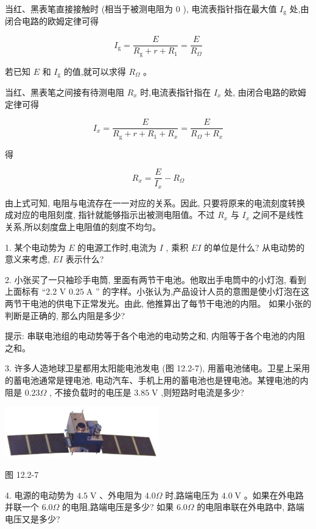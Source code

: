 \documentclass[10pt]{article}
\begin{document}
当红、黑表笔直接接触时 (相当于被测电阻为 0 ), 电流表指针指在最大值 \({I}_{\mathrm{g}}\) 处,由闭合电路的欧姆定律可得

\[
{I}_{\mathrm{g}} = \frac{E}{{R}_{\mathrm{g}} + r + {R}_{1}} = \frac{E}{{R}_{\Omega }}
\]

若已知 \(E\) 和 \({I}_{\mathrm{g}}\) 的值,就可以求得 \({R}_{\Omega }\) 。

当红、黑表笔之间接有待测电阻 \({R}_{x}\) 时,电流表指针指在 \({I}_{x}\) 处, 由闭合电路的欧姆定律可得

\[
{I}_{x} = \frac{E}{{R}_{\mathrm{g}} + r + {R}_{1} + {R}_{x}} = \frac{E}{{R}_{\Omega } + {R}_{x}}
\]

得

\[
{R}_{x} = \frac{E}{{I}_{x}} - {R}_{\Omega }
\]

由上式可知, 电阻与电流存在一一对应的关系。因此, 只要将原来的电流刻度转换成对应的电阻刻度, 指针就能够指示出被测电阻值。不过 \({R}_{x}\) 与 \({I}_{x}\) 之间不是线性关系,所以刻度盘上电阻值的刻度不均匀。

1. 某个电动势为 \(E\) 的电源工作时,电流为 \(I\) , 乘积 \({EI}\) 的单位是什么? 从电动势的意义来考虑, \({EI}\) 表示什么?

2. 小张买了一只袖珍手电筒, 里面有两节干电池。他取出手电筒中的小灯泡, 看到上面标有 “2.2 V \({0.25}\mathrm{\;A}\) ” 的字样。小张认为,产品设计人员的意图是使小灯泡在这两节干电池的供电下正常发光。由此, 他推算出了每节干电池的内阻。 如果小张的判断是正确的, 那么内阻是多少?

提示: 串联电池组的电动势等于各个电池的电动势之和, 内阻等于各个电池的内阻之和。

3. 许多人造地球卫星都用太阳能电池发电 (图 12.2-7), 用蓄电池储电。卫星上采用的蓄电池通常是锂电池, 电动汽车、手机上用的蓄电池也是锂电池。某锂电池的内阻是 \({0.23\Omega }\) , 不接负载时的电压是 \({3.85}\mathrm{\;V}\) ,则短路时电流是多少?

\begin{center}
\includegraphics[max width=0.5\textwidth]{images/01911d5f-8e38-70c0-b5b8-2b399bd115b6_93_398821.jpg}
\end{center}

图 12.2-7

4. 电源的电动势为 \({4.5}\mathrm{\;V}\) 、外电阻为 \({4.0\Omega }\) 时,路端电压为 \({4.0}\mathrm{\;V}\) 。如果在外电路并联一个 \({6.0\Omega }\) 的电阻,路端电压是多少? 如果 \({6.0\Omega }\) 的电阻串联在外电路中, 路端电压又是多少?
\end{document}
